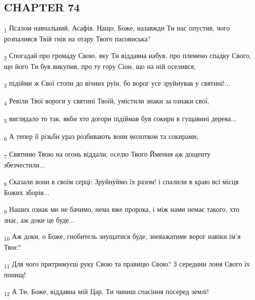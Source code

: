 \subsection{CHAPTER 74}
\begin{tcolorbox}
\textsubscript{1} Псалом навчальний, Асафів. Нащо, Боже, назавжди Ти нас опустив, чого розпалився Твій гнів на отару Твого пасовиська?
\end{tcolorbox}
\begin{tcolorbox}
\textsubscript{2} Спогадай про громаду Свою, яку Ти віддавна набув, про племено спадку Свого, що його Ти був викупив, про ту гору Сіон, що на ній оселився,
\end{tcolorbox}
\begin{tcolorbox}
\textsubscript{3} підійми ж Свої стопи до вічних руїн, бо ворог усе зруйнував у святині!...
\end{tcolorbox}
\begin{tcolorbox}
\textsubscript{4} Ревіли Твої вороги у святині Твоїй, умістили знаки за ознаки свої,
\end{tcolorbox}
\begin{tcolorbox}
\textsubscript{5} виглядало то так, якби хто догори підіймав був сокири в гущавині дерева...
\end{tcolorbox}
\begin{tcolorbox}
\textsubscript{6} А тепер її різьби ураз розбивають вони молотком та сокирами,
\end{tcolorbox}
\begin{tcolorbox}
\textsubscript{7} Святиню Твою на огонь віддали, оселю Твого Ймення аж дощенту збезчестили...
\end{tcolorbox}
\begin{tcolorbox}
\textsubscript{8} Сказали вони в своїм серці: Зруйнуймо їх разом! і спалили в краю всі місця Божих зборів...
\end{tcolorbox}
\begin{tcolorbox}
\textsubscript{9} Наших ознак ми не бачимо, нема вже пророка, і між нами немає такого, хто знає, аж доки це буде...
\end{tcolorbox}
\begin{tcolorbox}
\textsubscript{10} Аж доки, о Боже, гнобитель знущатися буде, зневажатиме ворог навіки ім'я Твоє?
\end{tcolorbox}
\begin{tcolorbox}
\textsubscript{11} Для чого притримуєш руку Свою та правицю Свою? З середини лоня Свого їх понищ!
\end{tcolorbox}
\begin{tcolorbox}
\textsubscript{12} А Ти, Боже, віддавна мій Цар, Ти чиниш спасіння посеред землі!
\end{tcolorbox}
